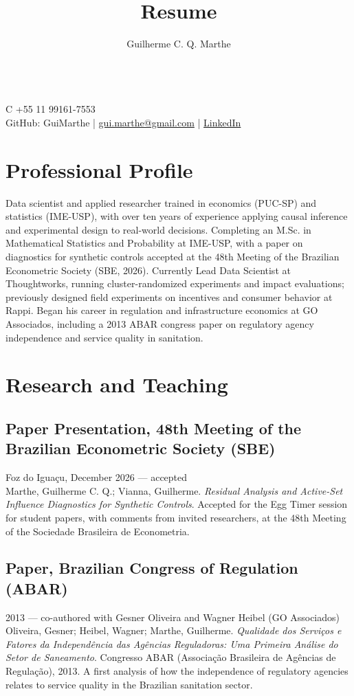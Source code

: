 \documentclass{article}
\author{Guilherme C. Q. Marthe}
\title{Resume}
\makeatletter
\renewcommand{\maketitle}{
\begin{flushleft}
	{\huge\theauthor}
	\vspace{0.2em}\\
	C +55 11 99161-7553\\
	GitHub: GuiMarthe | \href{mailto:gui.marthe@gmail.com}{gui.marthe@gmail.com} | \href{https://www.linkedin.com/in/gui42/}{LinkedIn}
\end{flushleft}
}
\newcommand{\jobdate}[3]{
\large
\vspace{0.05em}
  {#1, #2 --- #3}
\vspace{0.5em}
\\
}
\makeatother
\begin{document}
\maketitle

\section{Professional Profile}

 \linespread{.99}\large{
Data scientist and applied researcher trained in economics (PUC-SP) and statistics (IME-USP), with over ten years of experience applying causal inference and experimental design to real-world decisions. Completing an M.Sc. in Mathematical Statistics and Probability at IME-USP, with a paper on diagnostics for synthetic controls accepted at the 48th Meeting of the Brazilian Econometric Society (SBE, 2026). Currently Lead Data Scientist at Thoughtworks, running cluster-randomized experiments and impact evaluations; previously designed field experiments on incentives and consumer behavior at Rappi. Began his career in regulation and infrastructure economics at GO Associados, including a 2013 ABAR congress paper on regulatory agency independence and service quality in sanitation.
 }


\section{Research and Teaching}

\subsection{Paper Presentation, 48th Meeting of the Brazilian Econometric Society (SBE)}
\jobdate{Foz do Iguaçu}{December 2026}{accepted}
Marthe, Guilherme C. Q.; Vianna, Guilherme. \textit{Residual Analysis and Active-Set Influence Diagnostics for Synthetic Controls}. Accepted for the Egg Timer session for student papers, with comments from invited researchers, at the 48th Meeting of the Sociedade Brasileira de Econometria.

\vspace{1em}

\subsection{Paper, Brazilian Congress of Regulation (ABAR)}
{\large 2013 --- co-authored with Gesner Oliveira and Wagner Heibel (GO Associados)}\vspace{0.5em}\\
Oliveira, Gesner; Heibel, Wagner; Marthe, Guilherme. \textit{Qualidade dos Serviços e Fatores da Independência das Agências Reguladoras: Uma Primeira Análise do Setor de Saneamento}. Congresso ABAR (Associação Brasileira de Agências de Regulação), 2013. A first analysis of how the independence of regulatory agencies relates to service quality in the Brazilian sanitation sector.
\end{document}
